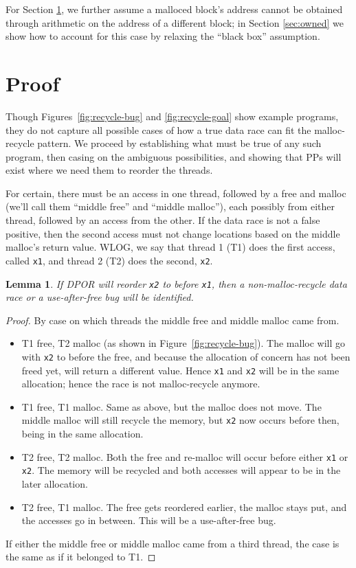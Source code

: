 \documentclass[pldi]{sigplanconf-pldi15}
\newtheorem{lemma}{Lemma}
\begin{document}
For Section \ref{sec:proof}, we further assume a malloced block's address cannot be obtained through arithmetic on the address of a different block; in Section \ref{sec:owned} we show how to account for this case by relaxing the ``black box'' assumption.


\section{Proof}
\label{sec:proof}

Though Figures~\ref{fig:recycle-bug} and \ref{fig:recycle-goal} show example programs, they do not capture all possible cases of how a true data race can fit the malloc-recycle pattern.
We proceed by establishing what must be true of any such program, then casing on the ambiguous possibilities, and showing that PPs will exist where we need them to reorder the threads.

For certain, there must be an access in one thread, followed by a free and malloc (we'll call them ``middle free'' and ``middle malloc''), each possibly from either thread, followed by an access from the other.
If the data race is not a false positive, then the second access must not change locations based on the middle malloc's return value.
WLOG, we say that thread 1 (T1) does the first access, called {\tt x1}, and thread 2 (T2) does the second, {\tt x2}.

\begin{lemma}
	If DPOR will reorder {\tt x2} to before {\tt x1}, then a non-malloc-recycle data race or a use-after-free bug will be identified.
	\label{lem:reorder}
\end{lemma}
\begin{proof}
By case on which threads the middle free and middle malloc came from.
\begin{itemize}
	\item T1 free, T2 malloc (as shown in Figure~\ref{fig:recycle-bug}). The malloc will go with {\tt x2} to before the free, and because the allocation of concern has not been freed yet, will return a different value. Hence {\tt x1} and {\tt x2} will be in the same allocation; hence the race is not malloc-recycle anymore.
	\item T1 free, T1 malloc. Same as above, but the malloc does not move. The middle malloc will still recycle the memory, but {\tt x2} now occurs before then, being in the same allocation.
	\item T2 free, T2 malloc. Both the free and re-malloc will occur before either {\tt x1} or {\tt x2}. The memory will be recycled and both accesses will appear to be in the later allocation.
	\item T2 free, T1 malloc. The free gets reordered earlier, the malloc stays put, and the accesses go in between. This will be a use-after-free bug.
\end{itemize}
If either the middle free or middle malloc came from a third thread, the case is the same as if it belonged to T1.
\end{proof}
\end{document}
